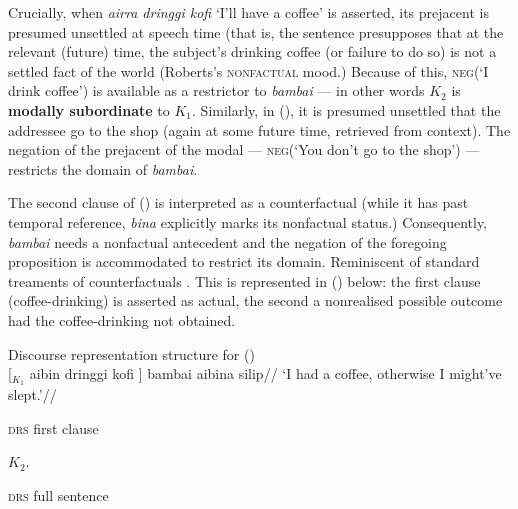 \xe


\noindent Crucially, when \textit{airra dringgi kofi} `I'll have a coffee' is asserted, its prejacent is presumed unsettled at speech time (that is, the sentence presupposes that at the relevant (future) time, the subject's drinking coffee (or failure to do so) is not a settled fact of the world (Roberts's \textsc{nonfactual} mood.) Because of this, \textsc{neg}(`I drink coffee') is
available as a restrictor to \textit{bambai} --- in other words $ \mathit{K_2} $ is \textbf{modally subordinate} to $ \mathit{K_1} $. Similarly, in (), it is presumed unsettled that the addressee go to the shop (again at some future time, retrieved from context). The negation of the prejacent of the modal --- \textsc{neg}(`You don't go to the shop') --- restricts the domain of \textit{bambai}.


The second clause of () is interpreted as a counterfactual (while it has past temporal reference, \textit{bina} explicitly marks its nonfactual status.) Consequently, \textit{bambai} needs a nonfactual antecedent and the negation of the foregoing proposition is accommodated to restrict its domain. Reminiscent of standard treaments of counterfactuals \citetext{\textit{i.e.}, where worlds in a nonrealistic proposition are ranked by their ``similarity'' to the actual world, see \citealp{Lewis1973,Kratzer1981,VonFintel2001,VonFintel2012}}. This is represented in () below: the first clause (coffee-drinking) is asserted as actual, the second a nonrealised possible outcome had the coffee-drinking not obtained.


\pex[labeltype=numeric,labelformat=$\mathit K_A.$] Discourse representation structure for ()\\
\begingl\gla{} \textup{[$ _{\mathit{K_1}} $} aibin dringgi kofi \textup{]} bambai aibina silip//
\glft`I had a coffee, otherwise I might've slept.'//\endgl{}\\
\a \begin{minipage}[t]{.25\textwidth}\textsc{drs} first clause\\
	
	
\end{minipage}$ \mathit{K_2} $.\quad\begin{minipage}[t]{.3\textwidth}\textsc{drs} full sentence\\
	
\end{minipage}


